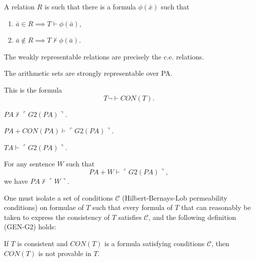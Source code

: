 \begin{definition}
  A relation $R$ is such that there is a formula $\phi(\bar{x})$ such that

  \begin{enumerate}
    \item $\bar{a}\in R \implies T\vdash \phi(\bar{a})$,
    \item $\bar{a}\not\in R \implies T\not\vdash \phi(\bar{a})$.
  \end{enumerate}
\end{definition}

\begin{fact}
  The weakly representable relations are precisely the c.e. relations.
\end{fact}

\begin{fact}
  The arithmetic sets are strongly representable over PA.
\end{fact}

\begin{definition}[G2(T)]
  This is the formula
  \[T \neg\vdash CON(T).\]
\end{definition}

\begin{fact}
  $PA \not\vdash \ulcorner G2(PA)\urcorner$.
\end{fact}

\begin{fact}
  $PA + CON(PA) \vdash \ulcorner G2(PA)\urcorner$.
\end{fact}

\begin{fact}
  $TA \vdash \ulcorner G2(PA)\urcorner$.
\end{fact}

\begin{fact}[Godel 1931]
  For any sentence $W$ such that
  \[PA+W \vdash \ulcorner G2(PA)\urcorner,\]
  we have $PA \not\vdash \ulcorner W\urcorner$.
\end{fact}

\begin{goal}
  One must isolate a set of conditions $\mathcal{C}$ (Hilbert-Bernays-Lob
  permeability conditions) on formulae of $T$ such that every formula of
  $T$ that can reasonably be taken to express the consistency of $T$
  satisfies $\mathcal{C}$, and the following definition (GEN-G2) holds:
\end{goal}

\begin{definition}[GEN-G2]
  If $T$ is consistent and $CON(T)$ is a formula satisfying conditions
  $\mathcal{C}$, then $CON(T)$ is not provable in $T$.
\end{definition}

